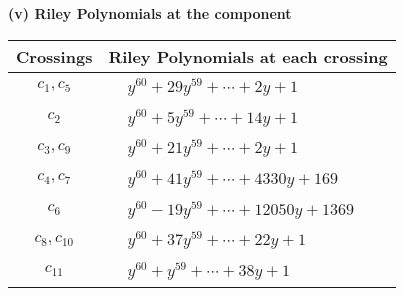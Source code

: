 \documentclass[1p]{elsarticle_modified}
\theoremstyle{definition}
\begin{document}
\newpage\renewcommand{\arraystretch}{1}
\flushleft \textbf{(v) Riley Polynomials at the component}\newline \\
\begin{tabular}{m{50pt}|m{274pt}}
Crossings & \hspace{64pt}Riley Polynomials at each crossing \\
\hline $$\begin{aligned}c_{1},c_{5}\end{aligned}$$&$\begin{aligned}
&y^{60}+29 y^{59}+\cdots+2 y+1
\end{aligned}$\\
\hline $$\begin{aligned}c_{2}\end{aligned}$$&$\begin{aligned}
&y^{60}+5 y^{59}+\cdots+14 y+1
\end{aligned}$\\
\hline $$\begin{aligned}c_{3},c_{9}\end{aligned}$$&$\begin{aligned}
&y^{60}+21 y^{59}+\cdots+2 y+1
\end{aligned}$\\
\hline $$\begin{aligned}c_{4},c_{7}\end{aligned}$$&$\begin{aligned}
&y^{60}+41 y^{59}+\cdots+4330 y+169
\end{aligned}$\\
\hline $$\begin{aligned}c_{6}\end{aligned}$$&$\begin{aligned}
&y^{60}-19 y^{59}+\cdots+12050 y+1369
\end{aligned}$\\
\hline $$\begin{aligned}c_{8},c_{10}\end{aligned}$$&$\begin{aligned}
&y^{60}+37 y^{59}+\cdots+22 y+1
\end{aligned}$\\
\hline $$\begin{aligned}c_{11}\end{aligned}$$&$\begin{aligned}
&y^{60}+y^{59}+\cdots+38 y+1
\end{aligned}$\\
\hline
\end{tabular}\\~\\
\end{document}
